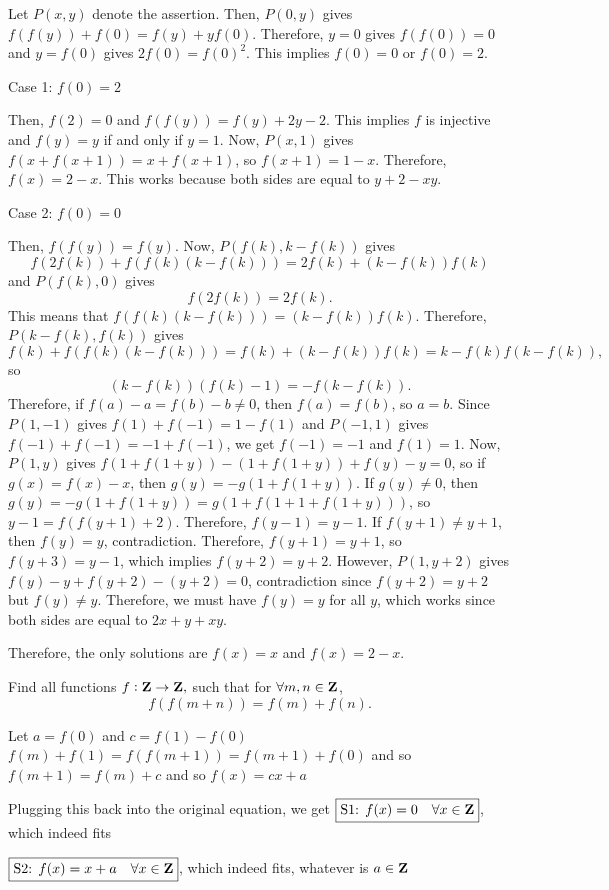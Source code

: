 \begin{solution}
Let $P(x,y)$ denote the assertion. Then, $P(0,y)$ gives $f(f(y))+f(0)=f(y)+yf(0)$. Therefore, $y=0$ gives $f(f(0))=0$ and $y=f(0)$ gives $2f(0)=f(0)^2$. This implies $f(0)=0$ or $f(0)=2$.

Case 1: $f(0)=2$

Then, $f(2)=0$ and $f(f(y))=f(y)+2y-2$. This implies $f$ is injective and $f(y)=y$ if and only if $y=1$. Now, $P(x,1)$ gives $f(x+f(x+1))=x+f(x+1)$, so $f(x+1)=1-x$. Therefore, $f(x)=2-x$. This works because both sides are equal to $y+2-xy$.

Case 2: $f(0)=0$

Then, $f(f(y))=f(y)$. Now, $P(f(k),k-f(k))$ gives$$f(2f(k))+f(f(k)(k-f(k)))=2f(k)+(k-f(k))f(k)$$and $P(f(k),0)$ gives
$$f(2f(k))=2f(k).$$This means that $f(f(k)(k-f(k)))=(k-f(k))f(k)$. Therefore, $P(k-f(k),f(k))$ gives
$$f(k)+f(f(k)(k-f(k)))=f(k)+(k-f(k))f(k)=k-f(k)f(k-f(k)),$$so$$(k-f(k))(f(k)-1)=-f(k-f(k)).$$Therefore, if $f(a)-a=f(b)-b\neq0$, then $f(a)=f(b)$, so $a=b$. Since $P(1,-1)$ gives $f(1)+f(-1)=1-f(1)$ and $P(-1,1)$ gives $f(-1)+f(-1)=-1+f(-1)$, we get $f(-1)=-1$ and $f(1)=1$. Now, $P(1,y)$ gives $f(1+f(1+y))-(1+f(1+y))+f(y)-y=0$, so if $g(x)=f(x)-x$, then $g(y)=-g(1+f(1+y))$. If $g(y)\neq0$, then $g(y)=-g(1+f(1+y))=g(1+f(1+1+f(1+y)))$, so $y-1=f(f(y+1)+2)$. Therefore, $f(y-1)=y-1$. If $f(y+1)\neq y+1$, then $f(y)=y$, contradiction. Therefore, $f(y+1)=y+1$, so $f(y+3)=y-1$, which implies $f(y+2)=y+2$. However, $P(1,y+2)$ gives $f(y)-y+f(y+2)-(y+2)=0$, contradiction since $f(y+2)=y+2$ but $f(y)\neq y$. Therefore, we must have $f(y)=y$ for all $y$, which works since both sides are equal to $2x+y+xy$.

Therefore, the only solutions are $\boxed{f(x)=x}$ and $\boxed{f(x)=2-x}$.
\end{solution}

\begin{prbm}[China 2016]
Find all functions $f:\mathbf Z\to\mathbf Z,$ such that for $\forall m,n\in\mathbf Z$,
\[ f(f(m+n))=f(m)+f(n).\]
\end{prbm}

\begin{solution}
Let $a=f(0)$ and $c=f(1)-f(0)$
$f(m)+f(1)=f(f(m+1))=f(m+1)+f(0)$ and so $f(m+1)=f(m)+c$ and so $f(x)=cx+a$

Plugging this back into the original equation, we get
$\boxed{\text{S1: }f(x)=0\quad\forall x\in\mathbf Z}$, which indeed fits

$\boxed{\text{S2: }f(x)=x+a\quad\forall x\in\mathbf Z}$, which indeed fits, whatever is $a\in\mathbf Z$
\end{solution}

